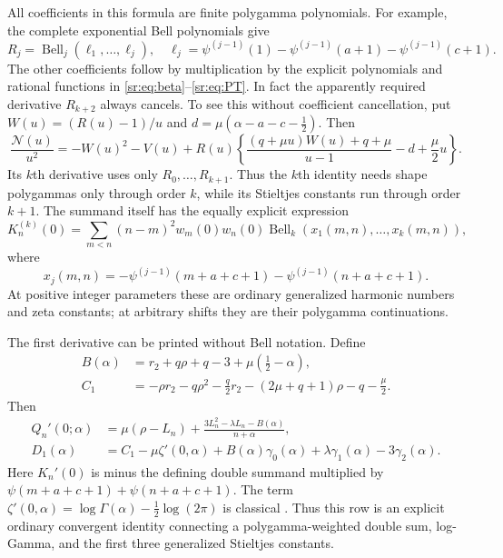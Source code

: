 \documentclass[11pt,letterpaper]{article}
\theoremstyle{definition}
\theoremstyle{remark}
\numberwithin{equation}{section}
\begin{document}
All coefficients in this formula are finite polygamma polynomials.
For example, the complete exponential Bell polynomials give
\[
 R_j=\operatorname{Bell}_j(\ell_1,\ldots,\ell_j),\quad
 \ell_j=\psi^{(j-1)}(1)-\psi^{(j-1)}(a+1)-\psi^{(j-1)}(c+1).
\]
The other coefficients follow by multiplication by the explicit
polynomials and rational functions in \eqref{sr:eq:beta}--\eqref{sr:eq:PT}.
In fact the apparently required derivative $R_{k+2}$ always cancels.
To see this without coefficient cancellation, put
$W(u)=(R(u)-1)/u$ and $d=\mu(\alpha-a-c-\tfrac12)$. Then
\begin{equation}\label{sr:eq:lower-order-G}
 \frac{\mathcal N(u)}{u^2}=-W(u)^2-V(u)
 +R(u)\left\{\frac{(q+\mu u)W(u)+q+\mu}{u-1}
                    -d+\frac\mu2u\right\}.
\end{equation}
Its $k$th derivative uses only $R_0,\ldots,R_{k+1}$.
Thus the $k$th identity needs shape polygammas only through order $k$,
while its Stieltjes constants run through order $k+1$.
The summand itself has the equally explicit expression
\begin{equation}\label{sr:eq:K-bell}
 K_n^{(k)}(0)=\sum_{m<n}(n-m)^2w_m(0)w_n(0)
 \operatorname{Bell}_k(x_1(m,n),\ldots,x_k(m,n)),
\end{equation}
where
\[
 x_j(m,n)=-\psi^{(j-1)}(m+a+c+1)-\psi^{(j-1)}(n+a+c+1).
\]
At positive integer parameters these are ordinary generalized harmonic
numbers and zeta constants; at arbitrary shifts they are their
polygamma continuations.

The first derivative can be printed without Bell notation. Define
\begin{align}
 B(\alpha)&=r_2+q\rho+q-3+\mu(\tfrac12-\alpha),\label{sr:eq:B}\\
 C_1&=-\rho r_2-q\rho^2-\frac q2r_2
 -(2\mu+q+1)\rho-q-\frac\mu2.
 \label{sr:eq:C1}
\end{align}
Then
\begin{align}
 Q_n'(0;\alpha)&=\mu(\rho-L_n)
 +\frac{3L_n^2-\lambda L_n-B(\alpha)}{n+\alpha},
 \label{sr:eq:Q1}\\
 D_1(\alpha)&=C_1-\mu\zeta'(0,\alpha)
 +B(\alpha)\gamma_0(\alpha)+\lambda\gamma_1(\alpha)
 -3\gamma_2(\alpha).
 \label{sr:eq:D1}
\end{align}
Here $K_n'(0)$ is minus the defining double summand multiplied by
$\psi(m+a+c+1)+\psi(n+a+c+1)$. The term
$\zeta'(0,\alpha)=\log\Gamma(\alpha)-\tfrac12\log(2\pi)$
is classical \cite[25.11.18]{dlmf-hurwitz}. Thus this row is an explicit
ordinary convergent identity connecting a polygamma-weighted double
sum, log-Gamma, and the first three generalized Stieltjes constants.
\end{document}
